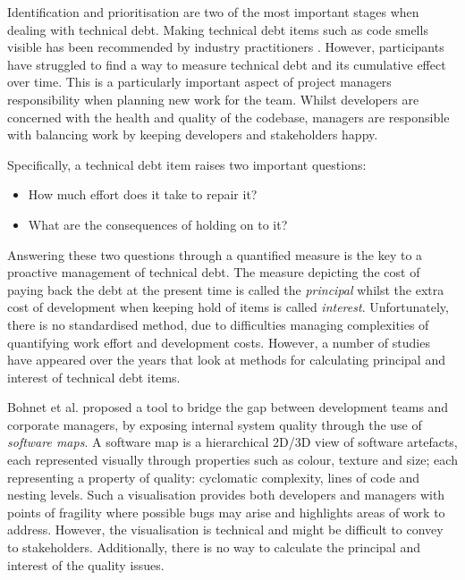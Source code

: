 \documentclass{mprop}
\begin{document}

Identification and prioritisation are two of the most important stages when
dealing with technical debt. Making technical debt items such as code smells
visible has been recommended by industry practitioners \cite{Lim2012}
\cite{Codabux2013}. However, participants have struggled to find a way to
measure technical debt and its cumulative effect over time. This is a
particularly important aspect of project managers responsibility when planning
new work for the team. Whilst developers are concerned with the health and
quality of the codebase, managers are responsible with balancing work by keeping
developers and stakeholders happy.

Specifically, a technical debt item raises two important questions:
\begin{itemize}
	\item How much effort does it take to repair it?
	\item What are the consequences of holding on to it?
\end{itemize}

Answering these two questions through a quantified measure is the key to a
proactive management of technical debt. The measure depicting the cost of paying
back the debt at the present time is called the \textit{principal} whilst the
extra cost of development when keeping hold of items is called
\textit{interest}. Unfortunately, there is no standardised method, due to
difficulties managing complexities of quantifying work effort and development
costs. However, a number of studies have appeared over the years that look at
methods for calculating principal and interest of technical debt items.

Bohnet et al. \cite{Bohnet2011} proposed a tool to bridge the gap between
development teams and corporate managers, by exposing internal system quality
through the use of \textit{software maps}. A software map is a hierarchical
2D/3D view of software artefacts, each represented visually through properties
such as colour, texture and size; each representing a property of quality:
cyclomatic complexity, lines of code and nesting levels. Such a visualisation
provides both developers and managers with points of fragility where possible
bugs may arise and highlights areas of work to address. However, the
visualisation is technical and might be difficult to convey to stakeholders.
Additionally, there is no way to calculate the principal and interest of the
quality issues.
\end{document}
